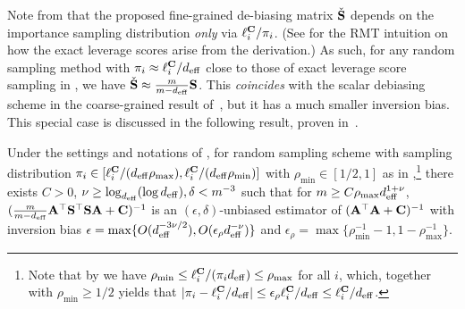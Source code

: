 \documentclass[11pt,a4paper]{article}
\begin{document}
Note from  that the proposed fine-grained de-biasing matrix $\check{\S}$ depends on the importance sampling distribution \emph{only} via $\ell_i^\C/\pi_i$. 
(See  for the RMT intuition on how the exact leverage scores arise from the derivation.)
As such, for any random sampling method with $\pi_i \approx \ell_i^\C/d_{\eff}$ close to those of exact leverage score sampling in , we have $\check{\S} \approx \frac{m}{m - d_{\eff}} \S$. 
This \emph{coincides} with the scalar debiasing scheme in the coarse-grained result of~, but it has a much smaller inversion bias.
This special case is discussed in the following result, proven in~.

\begin{corollary}\label{coro:inver_bias_constant_debias}
Under the settings and notations of , for random sampling scheme with sampling distribution
$\pi_i\in [\ell^{\C}_{i}/(d_{\eff} \rho_{\max}), \ell^{\C}_{i}/(d_{\eff} \rho_{\min})]$ with $\rho_{\min} \in [1/2,1]$ as in ,\footnote{Note that by  we have $\rho_{\min}\leq \ell_i^\C/(\pi_i  d_{\eff})\leq \rho_{\max}$ for all $i$, which, 
together with $\rho_{\min}\geq 1/2$ yields that $|\pi_i- \ell_i^{\C}/d_{\eff}|\leq \epsilon_{\rho}\ell_i^{\C}/d_{\eff}\leq\ell_i^{\C}/d_{\eff}$.} there exists $C> 0$, $\nu \geq \log_{d_{\eff}} (\log d_{\eff}), \delta < m^{-3}$ such that for $m \geq C\rho_{\max} d_{\eff}^{1+\nu}$, $(\frac{m}{m-d_{\eff}}\A^\top \S^\top\S \A + \C )^{-1}$ is an $(\epsilon,\delta)$-unbiased estimator of $(\A^\top  \A + \C)^{-1}$ with inversion bias $\epsilon=\max\{O(d_{\eff}^{-3\nu/2}),O(\epsilon_{\rho}d_{\eff}^{-\nu})\}$ and $\epsilon_{\rho}=\max\{\rho_{\min}^{-1}-1,1 - \rho_{\max}^{-1}\}$.  
\end{corollary}
\end{document}
